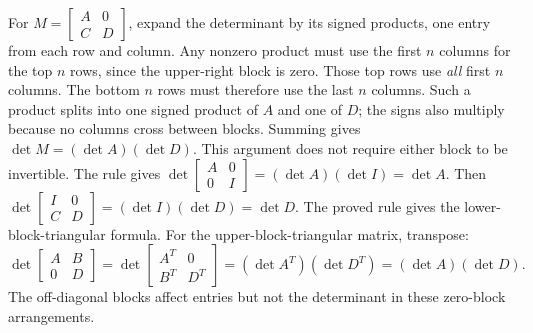 For $M=\left[\begin{smallmatrix}A&0\\C&D\end{smallmatrix}\right]$, expand the determinant by its signed products, one entry from each row and column. Any nonzero product must use the first $n$ columns for the top $n$ rows, since the upper-right block is zero. Those top rows use \emph{all} first $n$ columns. The bottom $n$ rows must therefore use the last $n$ columns. Such a product splits into one signed product of $A$ and one of $D$; the signs also multiply because no columns cross between blocks. Summing gives $\det M=(\det A)(\det D)$. This argument does not require either block to be invertible.
The rule gives $\det\left[\begin{smallmatrix}A&0\\0&I\end{smallmatrix}\right]=(\det A)(\det I)=\det A$.
Then $\det\left[\begin{smallmatrix}I&0\\C&D\end{smallmatrix}\right]=(\det I)(\det D)=\det D$.
The proved rule gives the lower-block-triangular formula. For the upper-block-triangular matrix, transpose:
\[
\det\begin{bmatrix}A&B\\0&D\end{bmatrix}
=\det\begin{bmatrix}A^T&0\\B^T&D^T\end{bmatrix}
=(\det A^T)(\det D^T)=(\det A)(\det D).
\]
The off-diagonal blocks affect entries but not the determinant in these zero-block arrangements.

